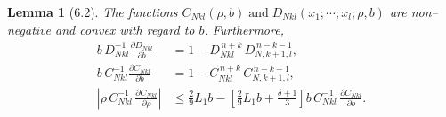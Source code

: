 \documentclass[11pt]{article}
\newtheorem{lemma}{Lemma}
\begin{document}
\begin{lemma}[6.2]
    The functions $C_{N kl}(\rho,b) \;\text{and}\; D_{N kl}(x_1;\cdots;x_l;\rho,b)$ are non–negative and convex with regard to $b$. Furthermore,
\begin{align}
b\,D^{-1}_{N kl}\frac{\partial D_{N kl}}{\partial b}
&=
1-D^{\,n+k}_{N kl}\,D^{\,n-k-1}_{N,k+1,l},
\tag{6.17a}\label{6.17a}\\[6pt]
b\,C^{-1}_{N kl}\frac{\partial C_{N kl}}{\partial b}
&=
1-C^{\,n+k}_{N kl}\,C^{\,n-k-1}_{N,k+1,l},\tag{6.17b}\label{6.17b}\\[6pt]
\left|\rho\,C^{-1}_{Nkl}\,\frac{\partial C_{Nkl}}{\partial\rho}\right|
&\le
\frac{2}{9}L_1 b
-\left[\frac{2}{9}L_1 b+\frac{\delta+1}{3}\right]
b\,C^{-1}_{Nkl}\,\frac{\partial C_{Nkl}}{\partial b}.
\tag{6.17c}\label{6.17c}
\end{align}
\end{lemma}
\end{document}
